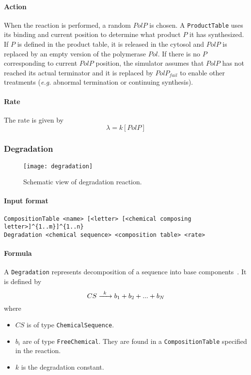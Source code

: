 \paragraph{Action} When the reaction is performed, a random $PolP$ is chosen. A \texttt{ProductTable} uses its binding and current position to determine what product $P$ it has synthesized. If $P$ is defined in the product table, it is released in the cytosol and $PolP$ is replaced by an empty version of the polymerase $Pol$. If there is no $P$ corresponding to current $PolP$ position, the simulator assumes that $PolP$ has not reached its actual terminator and it is replaced by $PolP_{fail}$ to enable other treatments (\textit{e.g.} abnormal termination or continuing synthesis).

\paragraph{Rate} The rate is given by
\[
\lambda = k[PolP]
\]

\subsubsection{Degradation}

\begin{figure}[!h]
  \centering
  \texttt{[image: degradation]}
  \caption{Schematic view of degradation reaction.}
  \label{fig:degradation}
\end{figure}

\paragraph{Input format}
\begin{verbatim}
CompositionTable <name> [<letter> [<chemical composing letter>]^{1..m}]^{1..n}
Degradation <chemical sequence> <composition table> <rate>
\end{verbatim}

\paragraph{Formula} A \texttt{Degradation} represents decomposition of a sequence into base components~. It is defined by
\[
\reactionIrr{CS}{b_1 + b_2 + ... + b_N}{k}{}
\]
where
\begin{itemize}
	\item $CS$ is of type \texttt{ChemicalSequence}.
	\item $b_i$ are of type \texttt{FreeChemical}. They are found in a \texttt{CompositionTable} specified in the reaction.
	\item $k$ is the degradation constant.
\end{itemize}

